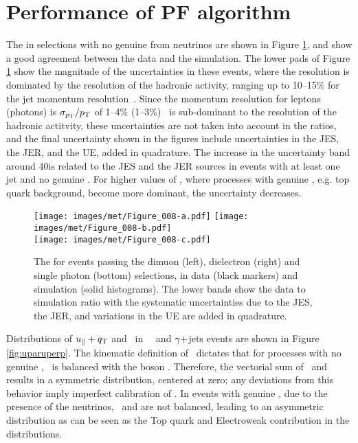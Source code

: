 \section{Performance of PF \ptmiss algorithm}
\noindent\justify
The \ptmiss in selections with no genuine \ptmiss from neutrinos are shown in Figure \ref{fig:met}, and show a good agreement between the data and the simulation. 
The lower pads of Figure \ref{fig:met} show the magnitude of the uncertainties in these events, where the \ptmiss resolution is dominated by the resolution of the hadronic activity, ranging up to 10--15\% for the jet momentum resolution~\cite{Khachatryan:2016kdb}. 
Since the momentum resolution for leptons (photons) is $\sigma_{p_{\mathrm{T}}}/p_{\mathrm{T}}$ of 1--4\% (1--3\%)~\cite{Khachatryan:2015iwa,Sirunyan:2018fpa} is sub-dominant to the resolution of the hadronic actitvity, these uncertainties are not taken into account in the ratios, and the final uncertainty shown in the figures include uncertainties in the JES, the JER, and the UE, added in quadrature. 
The increase in the uncertainty band around 40\GeV is related to the JES and the JER sources in events with at least one jet and no genuine \ptmiss. 
For higher values of \ptmiss, where processes with genuine \ptmiss, e.g. top quark background, become more dominant, the uncertainty decreases.
\begin{figure}[htbp!]
\centering
\texttt{[image: images/met/Figure\_008-a.pdf]}
\texttt{[image: images/met/Figure\_008-b.pdf]}\\
\texttt{[image: images/met/Figure\_008-c.pdf]}
\caption{The \ptmiss for events passing the dimuon (left), dielectron (right) and single photon (bottom) selections, in data (black markers) and simulation (solid histograms). The lower bands show the data to simulation ratio with the systematic uncertainties due to the JES, the JER, and variations in the UE are added in quadrature.}
\label{fig:met}
\end{figure}
\newpara
\noindent\justify
Distributions of $u_\Vert+{q}_{\mathrm T}$ and \uperp\ in \Zmm\, \Zee\, and $\gamma+$jets events are shown in Figure \ref{fig:uparuperp}. 
The kinematic definition of \upar\ dictates that for processes with no genuine \ptmiss, \upar\ is balanced with the boson \qt. 
Therefore, the vectorial sum of \upar\ and \qt results in a symmetric distribution, centered at zero; any deviations from this behavior imply imperfect calibration of \ptmiss. 
In events with genuine \ptmiss, due to the presence of the neutrinos, \upar\ and \qt are not balanced, leading to an asymmetric distribution as can be seen as the Top quark and Electroweak contribution in the distributions. 
